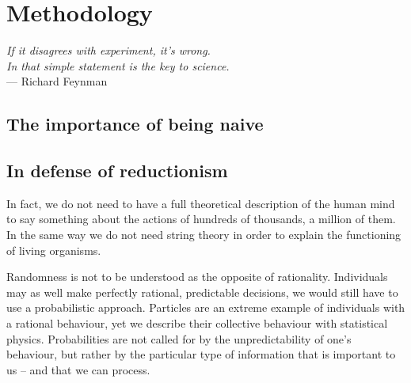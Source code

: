 

\chapter{Methodology}
\label{chap:methodology}

\begin{flushright}{\slshape    
If it disagrees with experiment, it's wrong.\\ 
In that simple statement is the key to science.} \\ \medskip
--- Richard Feynman~\cite{Feynman:1965}
\end{flushright}


\bigskip


\section{The importance of being naive}
\label{sec:the_importance_of_being_naive}

\section{In defense of reductionism}
\label{sec:in_defense_of_reductionism}

In fact, we do not need to have a full theoretical description of the human mind
to say something about the actions of hundreds of thousands, a million of them.
In the same way we do not need string theory in order to explain the
functioning of living organisms.

Randomness is not to be understood as the opposite of rationality. Individuals
may as well make perfectly rational, predictable decisions, we would still have
to use a probabilistic approach. Particles are an extreme example of individuals
with a rational behaviour, yet we describe their collective behaviour with
statistical physics. Probabilities are not called for by the unpredictability of
one's behaviour, but rather by the particular type of information that is
important to us -- and that we can process.

